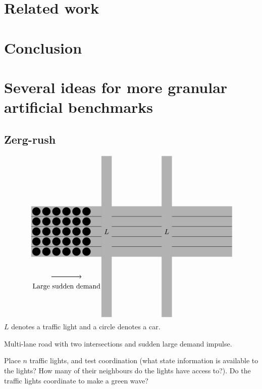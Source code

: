 \documentclass{article}
\begin{document}
\section{Related work}


\section{Conclusion}

\appendix
\section{Several ideas for more granular artificial benchmarks}

\def\road_color{white!70!black}
\def\car_color{black}
\subsection{Zerg-rush}
\[\begin{tikzpicture}[scale=0.5]
    \draw[color=\road_color, fill=\road_color] 
        (-10, 3) -- (10, 3) -- (10, -2) -- (-10, -2) -- (-10, 3);
    \foreach \y in {-1, 0, 1, 2} {
        \draw[color=black] (-10, \y) -- (10, \y);
    }
    \draw[color=\road_color, fill=\road_color]
        (-3, -8) -- (-3, 8) -- (-2, 8) -- (-2,-8) -- (-3, -8);
    \draw[color=\road_color, fill=\road_color]
        (3, -8) -- (3, 8) -- (4, 8) -- (4,-8) -- (3, -8);
    
    \node at (-2.5,0.5) {$L$};
    \node at (3.5,0.5) {$L$};
    
    \foreach \y in {-1.5, -0.5, 0.5, 1.5, 2.5} {
        \foreach \x in {-9.5, -8.5,..., -4.5} {
            \draw[fill=\car_color] (\x,\y) circle(0.4);
        }
    }
    
    \draw[->, thick] (-8, -4) -- (-5, -4);
    \node at (-6.5, -5) {Large sudden demand};
\end{tikzpicture}\]
$L$ denotes a traffic light and a circle denotes a car.

Multi-lane road with two intersections and sudden large demand impulse. 

Place $n$ traffic lights, and test coordination (what state information is available to the lights? How many of their neighbours do the lights have access to?). Do the traffic lights coordinate to make a green wave? 
\end{document}
